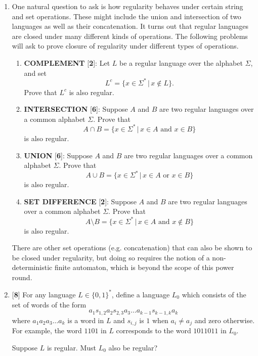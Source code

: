 \documentclass[11pt]{article}
\newcounter{enum}
\begin{document}
\begin{enumerate}
\begin{enumerate}
\end{enumerate}

\item One natural question to ask is how regularity behaves under certain string and set operations.  These might include the union and intersection of two languages as well as their concatenation.  It turns out that regular languages are closed under many different kinds of operations.  The following problems will ask to prove closure of regularity under different types of operations.

\begin{enumerate}

\item \textbf{COMPLEMENT} {[}\textbf{2}{]}: Let $L$ be a regular language over the alphabet $\Sigma$, and set \[L^c = \{x\in\Sigma^*\,|\, x\not\in L\}.\] Prove that $L^c$ is also regular.

\item \textbf{INTERSECTION} {[}\textbf{6}{]}: Suppose $A$ and $B$ are two regular languages over a common alphabet $\Sigma$.  Prove that \[A\cap B = \{x\in\Sigma^*\,|\,x\in A\text{ and }x\in B\}\] is also regular.

\item \textbf{UNION} {[}\textbf{6}{]}: Suppose $A$ and $B$ are two regular languages over a common alphabet $\Sigma$.  Prove that \[A\cup B = \{x\in\Sigma^*\,|\,x\in A\text{ or }x\in B\}\] is also regular.

\item\textbf{SET DIFFERENCE} {[}\textbf{2}{]}: Suppose $A$ and $B$ are two regular languages over a common alphabet $\Sigma$.  Prove that \[A\setminus B = \{x\in\Sigma^*\,|\,x\in A\text{ and }x\not\in B\}\] is also regular.

\end{enumerate}

There are other set operations (e.g. concatenation) that can also be shown to be closed under regularity, but doing so requires the notion of a non-deterministic finite automaton, which is beyond the scope of this power round.

\item {[}\textbf{8}{]} For any language $L\in\{0,1\}^*$, define a language $L_0$ which consists of the set of words of the form \[a_1s_{1,2}a_2s_{2,3}a_3\ldots a_{k-1}s_{k-1,k}a_k\] where $a_1a_2a_3\ldots a_k$ is a word in $L$ and $s_{i,j}$ is $1$ when $a_i\neq a_j$ and zero otherwise. For example, the word $1101$ in $L$ corresponds to the word $1011011$ in $L_0$.

\par Suppose $L$ is regular.  Must $L_0$ also be regular?
\setcounter{enum}{\theenumi}
\end{enumerate}
\end{document}
